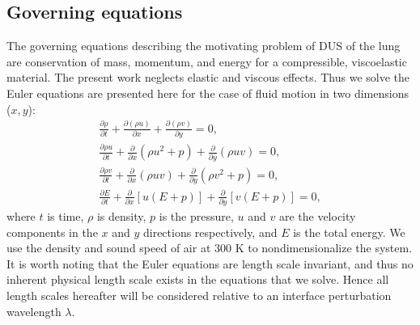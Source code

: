 \subsection{Governing equations}
The governing equations describing the motivating problem of \ac{DUS}
of the lung are conservation of mass, momentum, and energy for a
compressible, viscoelastic material. The present work neglects elastic
and viscous effects. Thus we solve the Euler equations are presented
here for the case of fluid motion in two dimensions ($x,y$):
% 
\begin{subequations} \label{eq:euler}%
  \begin{align}%
    \frac{\partial \rho}{\partial t} + \frac{\partial \left(\rho u\right)}{\partial x} + \frac{\partial \left(\rho v\right)}{\partial y} = 0,\\
    \frac{\partial \rho u}{\partial t} + \frac{\partial}{\partial x}\left( \rho u^2+p\right)  + \frac{\partial}{\partial y}\left( \rho uv\right) = 0,\\
    \frac{\partial \rho v}{\partial t} + \frac{\partial}{\partial x}\left( \rho uv\right)  + \frac{\partial}{\partial y}\left( \rho v^2+p\right) = 0,\\
    \frac{\partial E}{\partial t} + \frac{\partial}{\partial x}\left[u\left(E+p\right)\right] + \frac{\partial}{\partial y}\left[v\left(E+p\right)\right] = 0,
  \end{align}%
\end{subequations}%
% 
where $t$ is time, $\rho$ is density, $p$ is the pressure, $u$ and $v$
are the velocity components in the $x$ and $y$ directions
respectively, and $E$ is the total energy. We use the density and
sound speed of air at 300 K to nondimensionalize the system. It is
worth noting that the Euler equations are length scale invariant, and
thus no inherent physical length scale exists in the equations that we
solve. Hence all length scales hereafter will be considered relative
to an interface perturbation wavelength $\lambda$.

